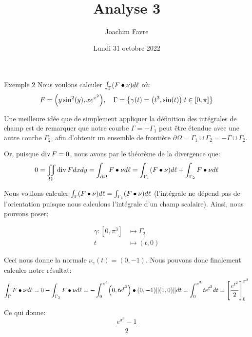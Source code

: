 \documentclass[a4paper]{article}
\title{Analyse 3}
\author{Joachim Favre}
\date{Lundi 31 octobre 2022}
\begin{document}
\maketitle


\begin{parag}{Exemple 2}
    Nous voulons calculer $\int_{\Gamma}\left(F \dotprod \nu\right) d \ell $ où: 
    \[F = \left(y\sin^2\left(y\right), xe^{x^2}\right), \mathspace \Gamma = \left\{\gamma\left(t\right) = \left(t^3, \sin\left(t\right)\right) | t \in \left[0, \pi\right]\right\}\]
    
    Une meilleure idée que de simplement appliquer la définition des intégrales de champ est de remarquer que notre courbe $\Gamma = -\Gamma_1$ peut être étendue avec une autre courbe $\Gamma_2$, afin d'obtenir un ensemble de frontière $\partial \Omega = \Gamma_1 \cup \Gamma_2 = -\Gamma \cup \Gamma_2$.

    Or, puisque $\operatorname{div} F = 0$, nous avons par le théorème de la divergence que: 
    \[0 = \iint_{\Omega} \Div F dxdy = \int_{\partial \Omega} F \dotprod \nu d \ell = \int_{\Gamma_1} \left(F \dotprod \nu\right) d \ell + \int_{\Gamma_2} F \dotprod \nu d \ell \]
    
    Nous voulons calculer $\int_{\Gamma} \left(F\dotprod \nu\right) d \ell = \int_{\Gamma_1} \left(F \dotprod \nu\right) d \ell $ (l'intégrale ne dépend pas de l'orientation puisque nous calculons l'intégrale d'un champ scalaire). Ainsi, nous pouvons poser:
    
    \[\begin{split}
    \gamma: \left[0, \pi^3\right] &\longmapsto \Gamma_2 \\
    t &\longmapsto \left(t, 0\right)
    \end{split}\]
    
    Ceci nous donne la normale $\nu_{\gamma}\left(t\right) = \left(0, -1\right)$. Nous pouvons donc finalement calculer notre résultat: 
    \[\int_{\Gamma} F \dotprod \nu d \ell = 0 - \int_{\Gamma_2} F \dotprod \nu d \ell = -\int_{0}^{\pi^3} \left(0, te^{t^2}\right) \dotprod \left(0, -1\right) \left\|\left(1, 0\right)\right\| dt = \int_{0}^{\pi^3} te^{t^2} dt = \left[\frac{e^{t^2}}{2}\right]_{0}^{\pi^3}\]

    Ce qui donne:
    \[\frac{e^{\pi^6} - 1}{2}\]
\end{parag}
\end{document}
